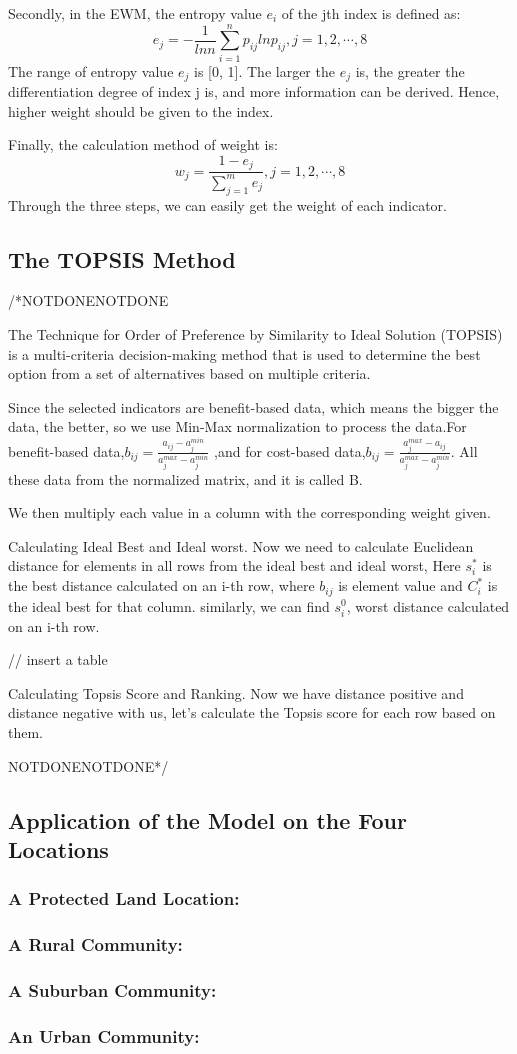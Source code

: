 Secondly, in the EWM, the entropy value $e_i$ of the jth index is defined as:$$e_j=-\frac{1}{lnn}\sum_{i=1}^np_{ij}lnp_{ij},j=1,2,\cdots,8$$
The range of entropy value $e_j$ is [0, 1]. The larger the $e_j$ is, the greater the differentiation degree of index j is, and more information can be derived. Hence, higher weight should be given to the index. 

Finally, the calculation method of weight is:$$w_j=\frac{1-e_j}{\sum_{j=1}^me_j},j=1,2,\cdots,8$$
Through the three steps, we can easily get the weight of each indicator.

\subsection{The TOPSIS Method}
/*NOTDONENOTDONE

The Technique for Order of Preference by Similarity to Ideal Solution (TOPSIS) is a multi-criteria decision-making method that is used to determine the best option from a set of alternatives based on multiple criteria. 

Since the selected indicators are benefit-based data, which means the bigger the data, the better, so we use Min-Max normalization to process the data.For benefit-based data,$b_{ij}=\frac{a_{ij}-a_j^{min}}{a_j^{max}-a_j^{min}}$ ,and for cost-based data,$b_{ij}=\frac{a_{j}^{max}-a_{ij}}{a_j^{max}-a_j^{min}}$. All these data from the normalized matrix, and it is called B.

We then multiply each value in a column with the corresponding weight given.

Calculating Ideal Best and Ideal worst. Now we need to calculate Euclidean distance for elements in all rows from the ideal best and ideal worst, Here $s_i^*$ is the best distance calculated on an i-th row, where $b_{ij}$ is element value and $C_i^{*}$ is the ideal best for that column. similarly, we can find $s_i^0$, worst distance calculated on an i-th row.

// insert a table

Calculating Topsis Score and Ranking. Now we have distance positive and distance negative with us, let’s calculate the Topsis score for each row based on them.

NOTDONENOTDONE*/


\subsection{Application of the Model on the Four Locations}


\subsubsection{A Protected Land Location: }

\subsubsection{A Rural Community: }

\subsubsection{A Suburban Community: }

\subsubsection{An Urban Community: }

